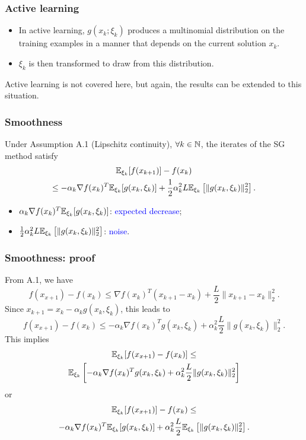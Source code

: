 \documentclass{beamer}
\begin{document}
\begin{frame}
\frametitle{Active learning}

\begin{itemize}
\item 
In active learning, $g(x_k; \xi_k)$ produces a multinomial
distribution on the training examples in a manner that depends on the current solution $x_k$.
\item
$\xi_k$ is then transformed to draw from this distribution.
\end{itemize}

Active learning is not covered here, but again, the results can be extended to this situation.

\end{frame}

\begin{frame}
\frametitle{Smoothness}

\begin{theorem}
Under Assumption A.1 (Lipschitz continuity), $\forall k \in {\mathbb{N}}$, the iterates of the SG method satisfy
\begin{multline*}
{\mathbb{E}}_{\xi_k}[f(x_{k+1})] - f(x_k)
\\ \leq
-\alpha_k \nabla f(x_k)^T{\mathbb{E}}_{\xi_k}[g(x_k,\xi_k)]
+\frac{1}{2} \alpha_k^2 L {\mathbb{E}}_{\xi_k} \left[ \| g(x_k, \xi_k )\|_2^2 \right].
\end{multline*}
\end{theorem}
\begin{itemize}
	\item $\alpha_k \nabla f(x_k)^T{\mathbb{E}}_{\xi_k}[g(x_k,\xi_k)]$: \textcolor{blue}{expected decrease};
	\item $\frac{1}{2} \alpha_k^2 L {\mathbb{E}}_{\xi_k} \left[ \| g(x_k, \xi_k )\|_2^2 \right]$: \textcolor{blue}{noise}.
\end{itemize}

\end{frame}

\begin{frame}
	\frametitle{Smoothness: proof}
	
	From A.1, we have
	$$
	f(x_{x+1}) - f(x_k) \leq \nabla f(x_k)^T (x_{k+1} - x_k) + \frac{L}{2} \| x_{k+1} - x_k \|^2_2.
	$$
	Since $x_{k+1} = x_k - \alpha_k g(x_k, \xi_k)$, this leads to
	$$
	f(x_{x+1}) - f(x_k) \leq - \alpha_k \nabla f(x_k)^T g(x_k, \xi_k) + \alpha_k^2 \frac{L}{2} \| g(x_k, \xi_k) \|^2_2.
	$$
	This implies
	\begin{multline*}
		{\mathbb{E}}_{\xi_k} [f(x_{x+1}) - f(x_k)] \leq \\ {\mathbb{E}}_{\xi_k} \left[ - \alpha_k \nabla f(x_k)^T g(x_k, \xi_k) + \alpha_k^2 \frac{L}{2} \| g(x_k, \xi_k) \|^2_2 \right]
	\end{multline*}
	or
	\begin{multline*}
		{\mathbb{E}}_{\xi_k} [f(x_{x+1})] - f(x_k) \leq \\ - \alpha_k \nabla f(x_k)^T {\mathbb{E}}_{\xi_k} [ g(x_k, \xi_k) ] + \alpha_k^2 \frac{L}{2} {\mathbb{E}}_{\xi_k} \left[ \| g(x_k, \xi_k) \|^2_2 \right].	
	\end{multline*}
	
	\begin{align*}
	\end{align*}
	
\end{frame}
\end{document}
